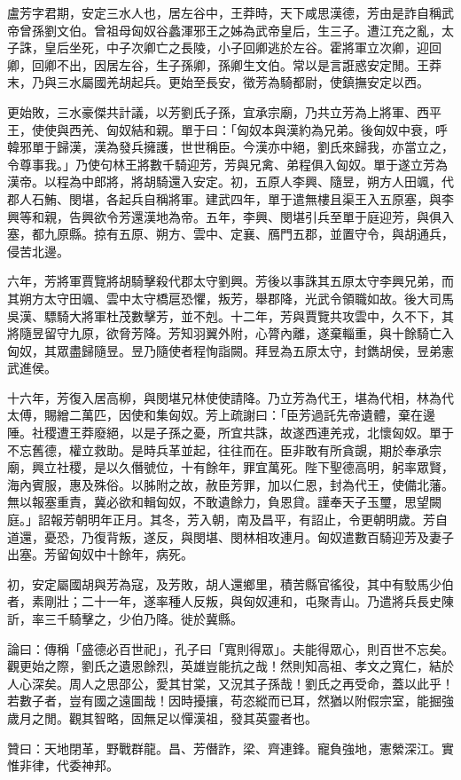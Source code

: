 \begin{pinyinscope}
盧芳字君期，安定三水人也，居左谷中，王莽時，天下咸思漢德，芳由是詐自稱武帝曾孫劉文伯。曾祖母匈奴谷蠡渾邪王之姊為武帝皇后，生三子。遭江充之亂，太子誅，皇后坐死，中子次卿亡之長陵，小子回卿逃於左谷。霍將軍立次卿，迎回卿，回卿不出，因居左谷，生子孫卿，孫卿生文伯。常以是言誑惑安定閒。王莽末，乃與三水屬國羌胡起兵。更始至長安，徵芳為騎都尉，使鎮撫安定以西。

更始敗，三水豪傑共計議，以芳劉氏子孫，宜承宗廟，乃共立芳為上將軍、西平王，使使與西羌、匈奴結和親。單于曰：「匈奴本與漢約為兄弟。後匈奴中衰，呼韓邪單于歸漢，漢為發兵擁護，世世稱臣。今漢亦中絕，劉氏來歸我，亦當立之，令尊事我。」乃使句林王將數千騎迎芳，芳與兄禽、弟程俱入匈奴。單于遂立芳為漢帝。以程為中郎將，將胡騎還入安定。初，五原人李興、隨昱，朔方人田颯，代郡人石鮪、閔堪，各起兵自稱將軍。建武四年，單于遣無樓且渠王入五原塞，與李興等和親，告興欲令芳還漢地為帝。五年，李興、閔堪引兵至單于庭迎芳，與俱入塞，都九原縣。掠有五原、朔方、雲中、定襄、鴈門五郡，並置守令，與胡通兵，侵苦北邊。

六年，芳將軍賈覽將胡騎擊殺代郡太守劉興。芳後以事誅其五原太守李興兄弟，而其朔方太守田颯、雲中太守橋扈恐懼，叛芳，舉郡降，光武令領職如故。後大司馬吳漢、驃騎大將軍杜茂數擊芳，並不剋。十二年，芳與賈覽共攻雲中，久不下，其將隨昱留守九原，欲脅芳降。芳知羽翼外附，心膂內離，遂棄輜重，與十餘騎亡入匈奴，其眾盡歸隨昱。昱乃隨使者程恂詣闕。拜昱為五原太守，封鐫胡侯，昱弟憲武進侯。

十六年，芳復入居高柳，與閔堪兄林使使請降。乃立芳為代王，堪為代相，林為代太傅，賜繒二萬匹，因使和集匈奴。芳上疏謝曰：「臣芳過託先帝遺體，棄在邊陲。社稷遭王莽廢絕，以是子孫之憂，所宜共誅，故遂西連羌戎，北懷匈奴。單于不忘舊德，權立救助。是時兵革並起，往往而在。臣非敢有所貪覬，期於奉承宗廟，興立社稷，是以久僭號位，十有餘年，罪宜萬死。陛下聖德高明，躬率眾賢，海內賓服，惠及殊俗。以胏附之故，赦臣芳罪，加以仁恩，封為代王，使備北藩。無以報塞重責，冀必欲和輯匈奴，不敢遺餘力，負恩貸。謹奉天子玉璽，思望闕庭。」詔報芳朝明年正月。其冬，芳入朝，南及昌平，有詔止，令更朝明歲。芳自道還，憂恐，乃復背叛，遂反，與閔堪、閔林相攻連月。匈奴遣數百騎迎芳及妻子出塞。芳留匈奴中十餘年，病死。

初，安定屬國胡與芳為寇，及芳敗，胡人還鄉里，積苦縣官徭役，其中有駮馬少伯者，素剛壯；二十一年，遂率種人反叛，與匈奴連和，屯聚青山。乃遣將兵長史陳訢，率三千騎擊之，少伯乃降。徙於冀縣。

論曰：傳稱「盛德必百世祀」，孔子曰「寬則得眾」。夫能得眾心，則百世不忘矣。觀更始之際，劉氏之遺恩餘烈，英雄豈能抗之哉！然則知高祖、孝文之寬仁，結於人心深矣。周人之思邵公，愛其甘棠，又況其子孫哉！劉氏之再受命，蓋以此乎！若數子者，豈有國之遠圖哉！因時擾攘，苟恣縱而已耳，然猶以附假宗室，能掘強歲月之閒。觀其智略，固無足以憚漢祖，發其英靈者也。

贊曰：天地閉革，野戰群龍。昌、芳僭詐，梁、齊連鋒。寵負強地，憲縈深江。實惟非律，代委神邦。


\end{pinyinscope}